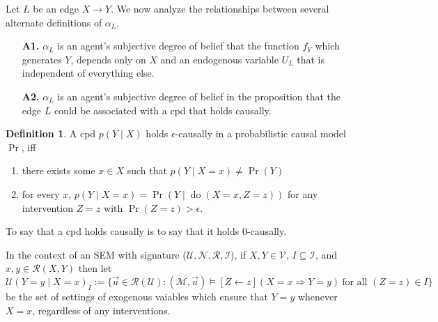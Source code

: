 \documentclass{article}
\newcommand{\N}{\mathcal N}
\theoremstyle{plain}
\newtheorem{prop}[theorem]{Proposition}
\theoremstyle{definition}
\newtheorem{defn}{Definition}
\theoremstyle{remark}
\newcommand{\cdo}{\mathop{\mathrm{do}}}
\begin{document}
Let $L$ be an edge $X \to Y$. We now analyze the relationships between several alternate definitions of $\alpha_L$.

\begin{itemize}
	\item[\textbf{A1.}] $\alpha_L$ is an agent's subjective degree of belief that the function $f_Y$ which generates $Y$, depends only on $X$ and an endogenous variable $U_L$ that is independent of everything else.
	\item[\textbf{A2.}] $\alpha_L$ is an agent's subjective degree of belief in the proposition that the edge $L$ could be associated with a cpd that holds causally.
\end{itemize}





\begin{defn}
	A cpd $p(Y \mid X)$ holds $\epsilon$-causally in a probabilistic causal model $\Pr$, iff 
	\begin{enumerate}[nosep]
		\item there exists some 
		 $x \in X$ such that $p(Y \mid X=x) \neq \Pr(Y)$
		 \item for every $x$, $p(Y \mid X=x) = \Pr(Y \mid \cdo(X=x,Z=z))$
	 	for any intervention $Z=z$ with $\Pr(Z = z) > \epsilon$.
	\end{enumerate}
	To say that a cpd holds causally is to say that it holds $0$-causally.	
\end{defn} 

In the context of an SEM with signature ($\mathcal U, \N, \mathcal R, \mathcal I$), if  $X,Y \in \mathcal V$, $I \subseteq \mathcal I$, and $x,y \in \mathcal R(X,Y)$ then let
\[ \mathcal U(Y\!=\!y \mid X \!=\!x)_{I} := \bigg\{ \vec u \in \mathcal R(\mathcal U) :
		(\mathcal M, \vec u) \models [Z \gets z](X \!=\! x \Rightarrow Y \!=\! y)
	~\text{for all } (Z=z) \in I
	\bigg\}%
 \]
be the set of settings of exogenous vaiables which ensure that  $Y\!=y$ whenever $X\!=x$, regardless of any interventions.

% 
\end{document}
